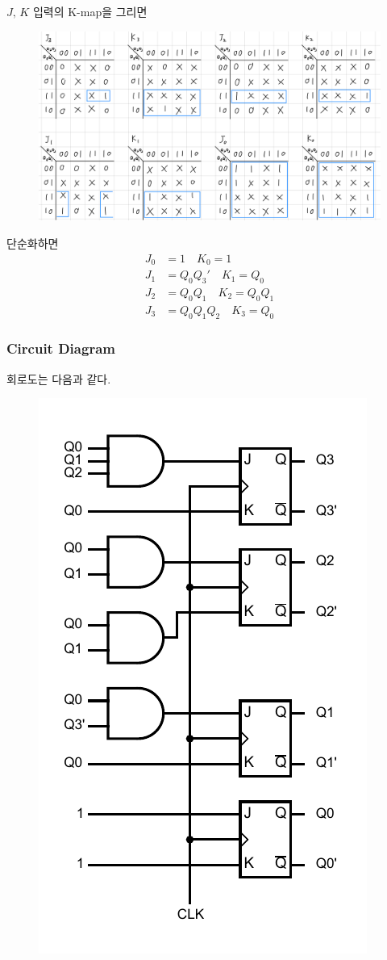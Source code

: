 \documentclass{scrartcl}
\begin{document}
\(J,\, K\) 입력의 K-map을 그리면
\begin{figure}[H]
  \centering
  \includegraphics[width=0.9\linewidth]{lab6_1_kmap.jpeg}
\end{figure}
단순화하면
\begin{align*}
  J_0 &= 1 \quad K_0 = 1 \\
  J_1 &= Q_0 Q_3' \quad K_1 = Q_0 \\
  J_2 &= Q_0 Q_1 \quad K_2 = Q_0 Q_1 \\
  J_3 &= Q_0 Q_1 Q_2 \quad K_3 = Q_0
\end{align*}

\subsubsection{Circuit Diagram}
회로도는 다음과 같다.
\begin{figure}[H]
  \centering
  \includegraphics[width=0.5\linewidth]{lab6_1_circuit.pdf}
\end{figure}
\end{document}
